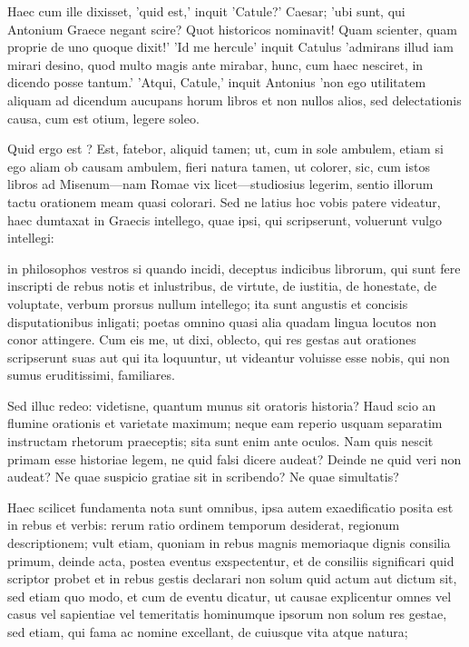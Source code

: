 Haec cum ille dixisset, 'quid est,' inquit 'Catule?' Caesar; 'ubi sunt, qui Antonium Graece negant scire? Quot historicos nominavit! Quam scienter, quam proprie de uno quoque dixit!' 'Id me hercule' inquit Catulus 'admirans illud iam mirari desino, quod multo magis ante mirabar, hunc, cum haec nesciret, in dicendo posse tantum.' 'Atqui, Catule,' inquit Antonius 'non ego utilitatem aliquam ad dicendum aucupans horum libros et non nullos alios, sed delectationis causa, cum est otium, legere soleo.

 Quid ergo est ? Est, fatebor, aliquid tamen; ut, cum in sole ambulem, etiam si ego aliam ob causam ambulem, fieri natura tamen, ut colorer, sic, cum istos libros ad Misenum—nam Romae vix licet—studiosius legerim, sentio illorum tactu orationem meam quasi colorari. Sed ne latius hoc vobis patere videatur, haec dumtaxat in Graecis intellego, quae ipsi, qui scripserunt, voluerunt vulgo intellegi:

 in philosophos vestros si quando incidi, deceptus indicibus librorum, qui sunt fere inscripti de rebus notis et inlustribus, de virtute, de iustitia, de honestate, de voluptate, verbum prorsus nullum intellego; ita sunt angustis et concisis disputationibus inligati; poetas omnino quasi alia quadam lingua locutos non conor attingere. Cum eis me, ut dixi, oblecto, qui res gestas aut orationes scripserunt suas aut qui ita loquuntur, ut videantur voluisse esse nobis, qui non sumus eruditissimi, familiares.

 Sed illuc redeo: videtisne, quantum munus sit oratoris historia? Haud scio an flumine orationis et varietate maximum; neque eam reperio usquam separatim instructam rhetorum praeceptis; sita sunt enim ante oculos. Nam quis nescit primam esse historiae legem, ne quid falsi dicere audeat? Deinde ne quid veri non audeat? Ne quae suspicio gratiae sit in scribendo? Ne quae simultatis?

 Haec scilicet fundamenta nota sunt omnibus, ipsa autem exaedificatio posita est in rebus et verbis: rerum ratio ordinem temporum desiderat, regionum descriptionem; vult etiam, quoniam in rebus magnis memoriaque dignis consilia primum, deinde acta, postea eventus exspectentur, et de consiliis significari quid scriptor probet et in rebus gestis declarari non solum quid actum aut dictum sit, sed etiam quo modo, et cum de eventu dicatur, ut causae explicentur omnes vel casus vel sapientiae vel temeritatis hominumque ipsorum non solum res gestae, sed etiam, qui fama ac nomine excellant, de cuiusque vita atque natura;

